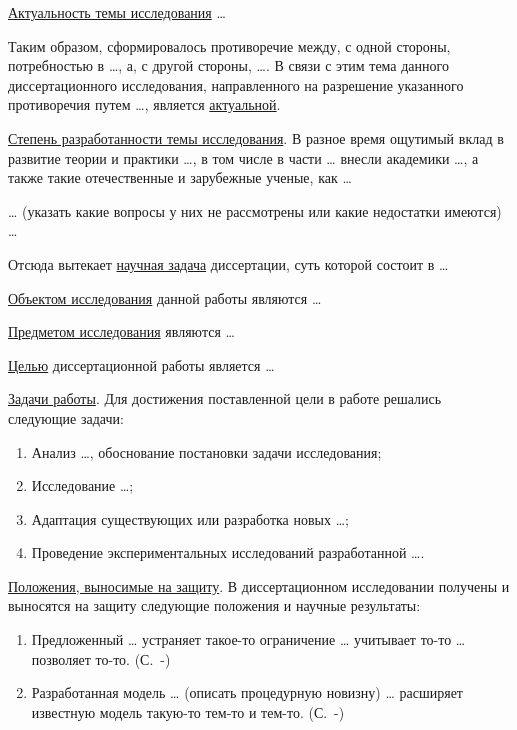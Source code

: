 
%
%
%
%

\underline{Актуальность темы исследования} \dots{}

Таким образом, сформировалось противоречие между, с одной стороны,
потребностью в \dots{}, а, с другой стороны, \dots{}. В связи с этим
тема данного диссертационного исследования, направленного на разрешение
указанного противоречия путем \dots{}, является
\underline{актуальной}.

\underline{Степень разработанности темы исследования}. В разное время
ощутимый вклад в развитие теории и практики \dots{}, в том числе в
части \dots{} внесли академики \dots{}, а также такие отечественные и
зарубежные ученые, как \dots{}

\dots{} (указать какие вопросы у них не рассмотрены или какие
недостатки имеются) \dots{}

Отсюда вытекает \underline{научная задача} диссертации, суть которой
состоит в \dots{}

\underline{Объектом исследования} данной работы являются \dots{}

\underline{Предметом исследования} являются \dots{}

\underline{Целью} диссертационной работы является \dots{}

\underline{Задачи работы}. Для достижения поставленной цели в работе
решались следующие задачи:
\begin{enumerate}
\item Анализ \dots{}, обоснование постановки задачи исследования;
\item Исследование \dots{};
\item Адаптация существующих или разработка новых \dots{};
\item Проведение экспериментальных исследований разработанной \dots{}.
\end{enumerate}

\underline{Положения, выносимые на защиту}. В диссертационном
исследовании получены и выносятся на защиту следующие положения и
научные результаты:
\begin{enumerate}
\item Предложенный \dots{} устраняет такое-то ограничение \dots{}
  учитывает то-то \dots{} позволяет
  то-то. (С.~\pageref{sect1_1}-\pageref{sect1_1-eof})
\item Разработанная модель \dots{} (описать процедурную новизну)
  \dots{} расширяет известную модель такую-то тем-то и
  тем-то. (С.~\pageref{sect2_1}-\pageref{sect2_1-eof})
\end{enumerate}

